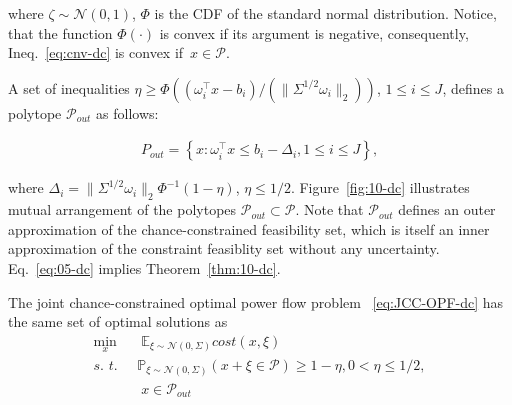 where $\zeta\sim \mathcal{N}(0,1)$, $\Phi$ is the CDF of the standard normal distribution. Notice, that the function $\Phi(\cdot)$ is convex if its argument is negative, consequently, Ineq.~\eqref{eq:cnv-dc} is convex if~$x\in \mathcal{P}$. 

A set of inequalities $\eta \ge \Phi\left((\omega_i^\top x - b_i)/(\|\Sigma^{1/2}\omega_i\|_2)\right)$, $1\le i \le J$, defines a polytope $\mathcal{P}_{out}$ as follows: 

\begin{align}\label{eq:05-dc}
  P_{out} = \left\{x: \omega_i^\top x \le b_i - \Delta_i, 1\leq i\leq J\right\},
\end{align}

where $\Delta_i = \|\Sigma^{1/2}\omega_i\|_2 \Phi^{-1}(1-\eta)$, $\eta \le 1/2$. %
Figure~\ref{fig:10-dc} illustrates mutual arrangement of the polytopes $\mathcal{P}_{out} \subset\mathcal{P}$. Note that $\mathcal{P}_{out}$ defines an outer approximation of the chance-constrained feasibility set, which is itself an inner approximation of the constraint feasiblity set without any uncertainty. Eq.~\eqref{eq:05-dc} implies 
Theorem~\ref{thm:10-dc}.
\begin{theorem}\label{thm:10-dc}
  The joint chance-constrained optimal power flow problem~ \eqref{eq:JCC-OPF-dc} has the same set of optimal solutions as 
  \begin{align}\label{eq:JCC-OPF-Ad-dc}
  \min_x & \;\mathbb{E}_{\xi\sim \mathcal{N}(0, \Sigma)} \textit{cost}(x,\xi)\\
   \textit{s. t. }\; & \mathbb{P}_{\xi\sim \mathcal{N}(0, \Sigma)} (x+\xi \in \mathcal{P}) \ge 1 - \eta, 0 < \eta \le 1/2,\nonumber\\
   & \; x\in \mathcal{P}_{out}\nonumber 
\end{align}
\end{theorem}
